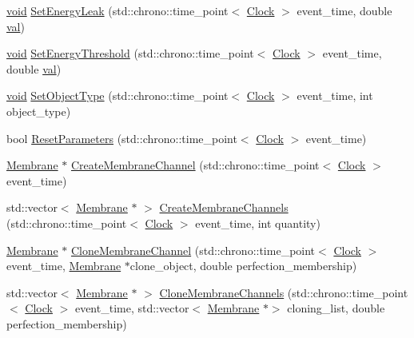 \begin{DoxyCompactItemize}
\item 
\mbox{\hyperlink{glad_8h_a950fc91edb4504f62f1c577bf4727c29}{void}} \mbox{\hyperlink{class_membrane_a96618ef2c05a8af5d6bd8606c9b8eae8}{Set\+Energy\+Leak}} (std\+::chrono\+::time\+\_\+point$<$ \mbox{\hyperlink{universe_8h_a0ef8d951d1ca5ab3cfaf7ab4c7a6fd80}{Clock}} $>$ event\+\_\+time, double \mbox{\hyperlink{glad_8h_a26942fd2ed566ef553eae82d2c109c8f}{val}})
\item 
\mbox{\hyperlink{glad_8h_a950fc91edb4504f62f1c577bf4727c29}{void}} \mbox{\hyperlink{class_membrane_a6d0b96fb6d823cc113dd56b8889b1544}{Set\+Energy\+Threshold}} (std\+::chrono\+::time\+\_\+point$<$ \mbox{\hyperlink{universe_8h_a0ef8d951d1ca5ab3cfaf7ab4c7a6fd80}{Clock}} $>$ event\+\_\+time, double \mbox{\hyperlink{glad_8h_a26942fd2ed566ef553eae82d2c109c8f}{val}})
\item 
\mbox{\hyperlink{glad_8h_a950fc91edb4504f62f1c577bf4727c29}{void}} \mbox{\hyperlink{class_membrane_a5ba2bcb906f3984b28f1030207e106ad}{Set\+Object\+Type}} (std\+::chrono\+::time\+\_\+point$<$ \mbox{\hyperlink{universe_8h_a0ef8d951d1ca5ab3cfaf7ab4c7a6fd80}{Clock}} $>$ event\+\_\+time, int object\+\_\+type)
\item 
bool \mbox{\hyperlink{class_membrane_a9c49462cf63495381a52e2defc80b1e4}{Reset\+Parameters}} (std\+::chrono\+::time\+\_\+point$<$ \mbox{\hyperlink{universe_8h_a0ef8d951d1ca5ab3cfaf7ab4c7a6fd80}{Clock}} $>$ event\+\_\+time)
\item 
\mbox{\hyperlink{class_membrane}{Membrane}} $\ast$ \mbox{\hyperlink{class_membrane_a589b56529ac634a52b2a5fc78d356973}{Create\+Membrane\+Channel}} (std\+::chrono\+::time\+\_\+point$<$ \mbox{\hyperlink{universe_8h_a0ef8d951d1ca5ab3cfaf7ab4c7a6fd80}{Clock}} $>$ event\+\_\+time)
\item 
std\+::vector$<$ \mbox{\hyperlink{class_membrane}{Membrane}} $\ast$ $>$ \mbox{\hyperlink{class_membrane_a72987fae41e552af5befcd9a62aa6e46}{Create\+Membrane\+Channels}} (std\+::chrono\+::time\+\_\+point$<$ \mbox{\hyperlink{universe_8h_a0ef8d951d1ca5ab3cfaf7ab4c7a6fd80}{Clock}} $>$ event\+\_\+time, int quantity)
\item 
\mbox{\hyperlink{class_membrane}{Membrane}} $\ast$ \mbox{\hyperlink{class_membrane_a9514ca4d4378e6467d2059a9d5f9b99b}{Clone\+Membrane\+Channel}} (std\+::chrono\+::time\+\_\+point$<$ \mbox{\hyperlink{universe_8h_a0ef8d951d1ca5ab3cfaf7ab4c7a6fd80}{Clock}} $>$ event\+\_\+time, \mbox{\hyperlink{class_membrane}{Membrane}} $\ast$clone\+\_\+object, double perfection\+\_\+membership)
\item 
std\+::vector$<$ \mbox{\hyperlink{class_membrane}{Membrane}} $\ast$ $>$ \mbox{\hyperlink{class_membrane_aa9958ea461092c0d2aceb07c9c34373c}{Clone\+Membrane\+Channels}} (std\+::chrono\+::time\+\_\+point$<$ \mbox{\hyperlink{universe_8h_a0ef8d951d1ca5ab3cfaf7ab4c7a6fd80}{Clock}} $>$ event\+\_\+time, std\+::vector$<$ \mbox{\hyperlink{class_membrane}{Membrane}} $\ast$$>$ cloning\+\_\+list, double perfection\+\_\+membership)
$$
\end{DoxyCompactItemize}
